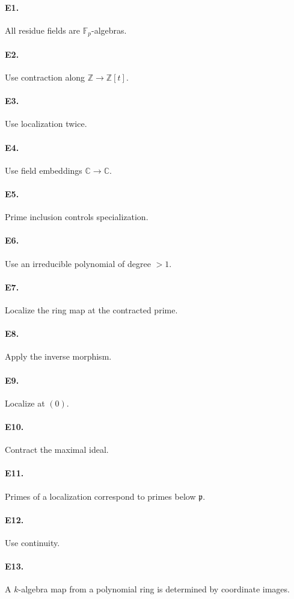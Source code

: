 \paragraph{E1.} All residue fields are $\mathbb F_p$-algebras.
\paragraph{E2.} Use contraction along $\mathbb Z\to\mathbb Z[t]$.
\paragraph{E3.} Use localization twice.
\paragraph{E4.} Use field embeddings $\mathbb C\to\mathbb C$.
\paragraph{E5.} Prime inclusion controls specialization.
\paragraph{E6.} Use an irreducible polynomial of degree $>1$.
\paragraph{E7.} Localize the ring map at the contracted prime.
\paragraph{E8.} Apply the inverse morphism.
\paragraph{E9.} Localize at $(0)$.
\paragraph{E10.} Contract the maximal ideal.
\paragraph{E11.} Primes of a localization correspond to primes below $\mathfrak p$.
\paragraph{E12.} Use continuity.
\paragraph{E13.} A $k$-algebra map from a polynomial ring is determined by coordinate images.
